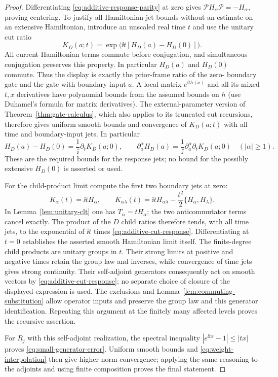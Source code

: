 \begin{proof}
Differentiating \eqref{eq:additive-response-parity} at zero
gives $\mathscr P H_\alpha\mathscr P=-H_\alpha$, proving
centering.  To justify all Hamiltonian-jet bounds without
an estimate on an extensive Hamiltonian, introduce an
unscaled real time $t$ and use the unitary cut ratio
\[
 K_D(a;t)=\exp\bigl(\ii t[H_D(a)-H_D(0)]\bigr).
\]
All current Hamiltonian terms commute before conjugation,
and simultaneous conjugation preserves this property.
In particular $H_D(a)$ and $H_D(0)$ commute.  Thus the
display is exactly the prior-frame ratio of the zero-
boundary gate and the gate with boundary input $a$.
A local matrix $e^{\ii t h(x)}$ and all its mixed $t,x$
derivatives have polynomial bounds from the assumed
bounds on $h$ (use Duhamel's formula for matrix derivatives).
The external-parameter version of
Theorem~\ref{thm:gate-calculus}, which also applies to its
truncated cut recursions, therefore gives uniform smooth
bounds and convergence of $K_D(a;t)$ with all time and
boundary-input jets.  In particular
\[
 H_D(a)-H_D(0)=\frac1\ii\partial_tK_D(a;0),\qquad
 \partial_a^\alpha H_D(a)
   =\frac1\ii\partial_a^\alpha\partial_tK_D(a;0)
       \quad(|\alpha|\geq1).
\]
These are the required bounds for the response jets;
no bound for the possibly extensive $H_D(0)$ is asserted
or used.

For the child-product limit compute the first two boundary
jets at zero:
\[
 K_\alpha(t)=\ii t H_\alpha,\qquad
 K_{\alpha\lambda}(t)=\ii t H_{\alpha\lambda}
                -\frac{t^2}{2}\{H_\alpha,H_\lambda\}.
\]
In Lemma~\ref{lem:unitary-clt} one has $T_\alpha=tH_\alpha$;
the two anticommutator terms cancel exactly.  The product
of the $D$ child ratios therefore tends, with all time
jets, to the exponential of $\ii t$ times
\eqref{eq:additive-cut-response}.  Differentiating at $t=0$
establishes the asserted smooth Hamiltonian limit itself.
The finite-degree child products are unitary groups in $t$.
Their strong limits at positive and negative times retain the
group law and inverses, while convergence of time jets gives
strong continuity.  Their self-adjoint generators consequently
act on smooth vectors by \eqref{eq:additive-cut-response};
no separate choice of closure of the displayed expression is used.
The exclusions and Lemma~\ref{lem:commuting-substitution}
allow operator inputs and preserve the group law and this
generator identification.  Repeating this argument at the
finitely many affected levels proves the recursive assertion.

For $R_j$ with this self-adjoint realization, the spectral inequality
$|e^{\ii tx}-1|\leq|t x|$ proves
\eqref{eq:small-generator-error}.  Uniform smooth
bounds and \eqref{eq:weight-interpolation} then give
higher-norm convergence; applying the same reasoning
to the adjoints and using finite composition proves
the final statement.
\end{proof}

